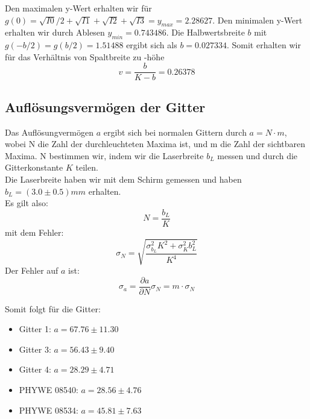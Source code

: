 Den maximalen y-Wert erhalten wir für $g\left( 0 \right) = \sqrt{I0}/2+\sqrt{I1}+\sqrt{I2}+\sqrt{I3} = y_{max} = 2.28627 $. Den minimalen y-Wert erhalten wir durch Ablesen $ y_{min} = 0.743486 $. Die Halbwertsbreite $b$ mit $ g\left( - b/2 \right) = g \left( b/2 \right) = 1.51488 $ ergibt sich als $ b = 0.027334 $. Somit erhalten wir für das Verhältnis von Spaltbreite zu -höhe
$$ v = \frac{b}{K-b} = 0.26378 $$ %

\subsection{Aufl\"osungsverm\"ogen der Gitter}

Das Aufl\"osungverm\"ogen $a$ ergibt sich bei normalen Gittern durch $a=N\cdot m$, wobei N die Zahl der durchleuchteten Maxima ist, und m die Zahl der sichtbaren Maxima. N bestimmen wir, indem wir die Laserbreite $b_L$ messen und durch die Gitterkonstante $K$ teilen.\\
Die Laserbreite haben wir mit dem Schirm gemessen und haben $b_L = (3.0 \pm 0.5) mm$ erhalten.\\
Es gilt also: $$N = \frac{b_L}{K}$$
mit dem Fehler: $$\sigma_N = \sqrt{\frac{\sigma_{b_L}^2K^2 + \sigma_K^2b_L^2}{K^4}}$$
Der Fehler auf $a$ ist: $$\sigma_a = \frac{\partial a}{\partial N}\sigma_N = m\cdot \sigma_N$$

Somit folgt f\"ur die Gitter:

\begin{itemize}
\item Gitter 1: $ a = 67.76 \pm 11.30 $
\item Gitter 3: $ a = 56.43 \pm 9.40 $
\item Gitter 4: $ a = 28.29 \pm 4.71 $
\item PHYWE 08540: $ a = 28.56 \pm 4.76 $
\item PHYWE 08534: $ a = 45.81 \pm 7.63 $
\end{itemize}


